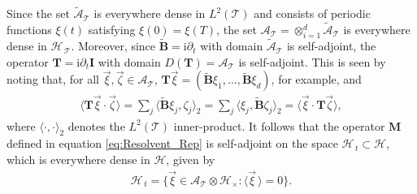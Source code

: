 \documentclass[11pt]{amsart}
\newcommand{\I}{\mathrm{i}}
\newcommand{\Mb}{\mathbf{M}}
\newcommand{\Tb}{\mathbf{T}}
\newcommand{\Ib}{\mathbf{I}}
\newcommand{\Bb}{\mathbf{B}}
\newcommand{\Tc}{\mathcal{T}}
\newcommand{\Hs}{\mathscr{H}}
\newcommand{\As}{\mathscr{A}}
\begin{document}
Since the set $\tilde{\As}_{\Tc}$ is everywhere dense in $L^2(\Tc)$
and consists of periodic functions $\xi(t)$ satisfying $\xi(0)=\xi(T)$,
the set $\As_{\Tc}=\otimes_{i=1}^d\tilde{\As}_{\Tc}$ is everywhere dense in
$\Hs_{\,\Tc}$. Moreover, since $\tilde{\Bb}=\I\partial_t$ with domain
$\tilde{\As}_{\Tc}$ is self-adjoint, the operator $\Tb=\I\partial_t\Ib$ with
domain $D(\Tb)=\As_{\Tc}$ is self-adjoint. This is seen by noting
that, for all $\vec{\xi},\vec{\zeta}\in\As_{\Tc}$,
$\Tb\vec{\xi}=(\tilde{\Bb}\xi_1,\ldots,\tilde{\Bb}\xi_d)$, for example, and  
%
\begin{align}
  \langle\Tb\vec{\xi}\cdot\vec{\zeta}\rangle=\sum_j\langle\tilde{\Bb}\xi_j,\zeta_j\rangle_2
                    =\sum_j\langle\xi_j,\tilde{\Bb}\zeta_j\rangle_2
                    =\langle\vec{\xi}\cdot\Tb\vec{\zeta}\rangle,
\end{align}
%
where $\langle\cdot,\cdot\rangle_2$ denotes the $L^2(\Tc)$ inner-product.
It follows that the operator $\Mb$ defined in equation
\eqref{eq:Resolvent_Rep} is self-adjoint on the space $\Hs_{\,t}\subset\Hs$,
which is everywhere dense in $\Hs$, given by
%
\begin{align}\label{eq:Ht_2}
  \Hs_{\,t}=\{\vec{\xi}\in\As_{\Tc}\otimes\Hs_\times: \langle\vec{\xi}\,\rangle=0\}.
\end{align}
%
\end{document}
